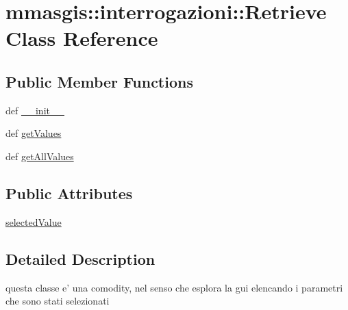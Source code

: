 \hypertarget{classmmasgis_1_1interrogazioni_1_1Retrieve}{
\section{mmasgis::interrogazioni::Retrieve Class Reference}
\label{classmmasgis_1_1interrogazioni_1_1Retrieve}
}
\subsection*{Public Member Functions}
\begin{DoxyCompactItemize}
\item 
def \hyperlink{classmmasgis_1_1interrogazioni_1_1Retrieve_acc043e8267cfe131bd3c0ad333f894b2}{\_\-\_\-init\_\-\_\-}
\item 
def \hyperlink{classmmasgis_1_1interrogazioni_1_1Retrieve_a2af30e2e044e7472f0477160b9713c9f}{getValues}
\item 
def \hyperlink{classmmasgis_1_1interrogazioni_1_1Retrieve_aa621eea2fabfa747949a9e3d428a23cd}{getAllValues}
\end{DoxyCompactItemize}
\subsection*{Public Attributes}
\begin{DoxyCompactItemize}
\item 
\hyperlink{classmmasgis_1_1interrogazioni_1_1Retrieve_ab8157fe854cf2b42e4da70ce4d1324f7}{selectedValue}
\end{DoxyCompactItemize}


\subsection{Detailed Description}
\begin{DoxyVerb}
questa classe e' una comodity, nel senso che esplora la gui elencando i parametri che sono stati selezionati
\end{DoxyVerb}
 

